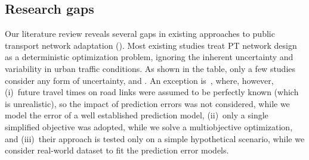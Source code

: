 \documentclass[a4paper,fleqn]{cas-sc}
\begin{document}
\subsection{Research gaps}
Our literature review reveals several gaps in existing approaches to public transport network adaptation ().
%
Most existing studies treat PT network design as a deterministic optimization problem, ignoring the inherent uncertainty and variability in urban traffic conditions. As shown in the table, only a few studies consider any form of uncertainty, and .
%
 An exception is~\citet{guo2025data}, where, however, (i)~future travel times on road links were assumed to be perfectly known (which is unrealistic), so the impact of prediction errors was not considered, while we model the error of a well established prediction model, (ii)~only a single simplified objective was adopted, while we solve a multiobjective optimization, and (iii)~their approach is tested only on a simple hypothetical scenario, while we consider real-world dataset to fit the prediction error models.
\end{document}
